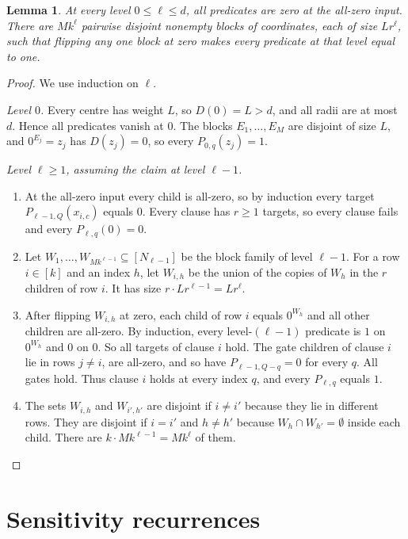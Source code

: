 \documentclass[11pt]{article}
\newtheorem{lemma}[theorem]{Lemma}
\theoremstyle{definition}
\theoremstyle{remark}
\begin{document}
\begin{lemma}\label{lem:blocks}
At every level \(0\le\ell\le d\), all predicates are zero at the
all-zero input. There are \(Mk^\ell\) pairwise disjoint nonempty blocks
of coordinates, each of size \(Lr^\ell\), such that flipping any one
block at zero makes every predicate at that level equal to one.
\end{lemma}
\begin{proof}
We use induction on \(\ell\).

\emph{Level \(0\).} Every centre has weight \(L\), so \(D(0)=L>d\), and all radii are at most \(d\). Hence all predicates vanish at \(0\).
The blocks \(E_1,\ldots,E_M\) are disjoint of size \(L\), and \(0^{E_j}=z_j\) has \(D(z_j)=0\), so every \(P_{0,q}(z_j)=1\).

\emph{Level \(\ell\ge1\), assuming the claim at level \(\ell-1\).}
\begin{enumerate}[leftmargin=*]
\item At the all-zero input every child is all-zero, so by induction every target \(P_{\ell-1,Q}(x_{i,c})\) equals \(0\). Every clause has \(r\ge1\) targets, so every clause fails and every \(P_{\ell,q}(0)=0\).
\item Let \(W_1,\ldots,W_{Mk^{\ell-1}}\subseteq[N_{\ell-1}]\) be the block family of level \(\ell-1\). For a row \(i\in[k]\) and an index \(h\), let \(W_{i,h}\) be the union of the copies of \(W_h\) in the \(r\) children of row \(i\). It has size \(r\cdot Lr^{\ell-1}=Lr^\ell\).
\item After flipping \(W_{i,h}\) at zero, each child of row \(i\) equals \(0^{W_h}\) and all other children are all-zero. By induction, every level-\((\ell-1)\) predicate is \(1\) on \(0^{W_h}\) and \(0\) on \(0\). So all targets of clause \(i\) hold. The gate children of clause \(i\) lie in rows \(j\ne i\), are all-zero, and so have \(P_{\ell-1,Q-q}=0\) for every \(q\). All gates hold. Thus clause \(i\) holds at every index \(q\), and every \(P_{\ell,q}\) equals \(1\).
\item The sets \(W_{i,h}\) and \(W_{i',h'}\) are disjoint if \(i\ne i'\) because they lie in different rows. They are disjoint if \(i=i'\) and \(h\ne h'\) because \(W_h\cap W_{h'}=\emptyset\) inside each child. There are \(k\cdot Mk^{\ell-1}=Mk^\ell\) of them.\qedhere
\end{enumerate}
\end{proof}

\section{Sensitivity recurrences}
\label{sec:recurrences}
\end{document}
